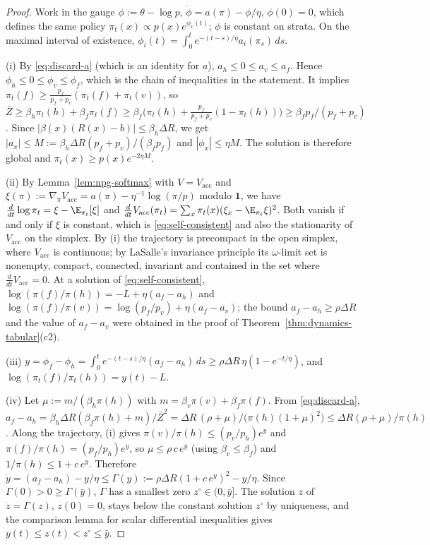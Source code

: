 \begin{proof}
Work in the gauge $\phi:=\theta-\log p$, $\dot\phi=a(\pi)-\phi/\eta$,
$\phi(0)=0$, which defines the same policy
$\pi_t(x)\propto p(x)e^{\phi_x(t)}$; $\phi$ is constant on strata. On the
maximal interval of existence,
$\phi_i(t)=\int_0^te^{-(t-s)/\eta}a_i(\pi_s)\,ds$.

(i) By \eqref{eq:discard-a} (which is an identity for $a$),
$a_h\le0\le a_v\le a_f$. Hence $\phi_h\le0\le\phi_v\le\phi_f$, which is the
chain of inequalities in the statement. It implies
$\pi_t(f)\ge\frac{p_f}{p_f+p_v}(\pi_t(f)+\pi_t(v))$, so
$\bar Z\ge\beta_h\pi_t(h)+\beta_f\pi_t(f)\ge\beta_f\bigl(\pi_t(h)+\tfrac{p_f}{p_f+p_v}(1-\pi_t(h))\bigr)\ge\beta_fp_f/(p_f+p_v)$.
Since $|\beta(x)(R(x)-b)|\le\beta_h\Delta R$, we get
$|a_x|\le M:=\beta_h\Delta R(p_f+p_v)/(\beta_fp_f)$ and $|\phi_x|\le\eta M$.
The solution is therefore global and
$\pi_t(x)\ge p(x)e^{-2\eta M}$.

(ii) By Lemma~\ref{lem:npg-softmax} with $V=V_{\mathrm{acc}}$ and
$\xi(\pi):=\nabla_\pi V_{\mathrm{acc}}=a(\pi)-\eta^{-1}\log(\pi/p)$ modulo
$\mathbf 1$, we have $\frac{d}{dt}\log\pi_t=\xi-\E_{\pi_t}[\xi]$ and
$\frac{d}{dt}V_{\mathrm{acc}}(\pi_t)=\sum_x\pi_t(x)(\xi_x-\E_{\pi_t}\xi)^2$.
Both vanish if and only if $\xi$ is constant, which is
\eqref{eq:self-consistent} and also the stationarity of
$V_{\mathrm{acc}}$ on the simplex. By (i) the trajectory is precompact in
the open simplex, where $V_{\mathrm{acc}}$ is continuous; by LaSalle's
invariance principle \cite{lasalle1976stability} its $\omega$-limit set is
nonempty, compact, connected, invariant and contained in the set where
$\frac{d}{dt}V_{\mathrm{acc}}=0$. At a solution of
\eqref{eq:self-consistent},
$\log(\pi(f)/\pi(h))=-L+\eta(a_f-a_h)$ and
$\log(\pi(f)/\pi(v))=\log(p_f/p_v)+\eta(a_f-a_v)$; the bound
$a_f-a_h\ge\rho\Delta R$ and the value of $a_f-a_v$ were obtained in the
proof of Theorem~\ref{thm:dynamics-tabular}(c2).

(iii) $y=\phi_f-\phi_h=\int_0^te^{-(t-s)/\eta}(a_f-a_h)\,ds\ge\rho\Delta R\,\eta(1-e^{-t/\eta})$,
and $\log(\pi_t(f)/\pi_t(h))=y(t)-L$.

(iv) Let $\mu:=m/(\beta_h\pi(h))$ with $m=\beta_v\pi(v)+\beta_f\pi(f)$.
From \eqref{eq:discard-a},
$a_f-a_h=\beta_h\Delta R(\beta_f\pi(h)+m)/\bar Z^2
=\Delta R\,(\rho+\mu)/\bigl(\pi(h)(1+\mu)^2\bigr)\le\Delta R(\rho+\mu)/\pi(h)$.
Along the trajectory, (i) gives
$\pi(v)/\pi(h)\le(p_v/p_h)e^{y}$ and $\pi(f)/\pi(h)=(p_f/p_h)e^{y}$, so
$\mu\le\rho\,c\,e^{y}$ (using $\beta_v\le\beta_f$) and
$1/\pi(h)\le1+c\,e^{y}$. Therefore
$\dot y=(a_f-a_h)-y/\eta\le\Gamma(y):=\rho\Delta R(1+c\,e^{y})^2-y/\eta$.
Since $\Gamma(0)>0\ge\Gamma(\bar y)$, $\Gamma$ has a smallest zero
$z^\circ\in(0,\bar y]$. The solution $z$ of $\dot z=\Gamma(z)$, $z(0)=0$,
stays below the constant solution $z^\circ$ by uniqueness, and the
comparison lemma for scalar differential inequalities gives
$y(t)\le z(t)<z^\circ\le\bar y$.


\end{proof}
